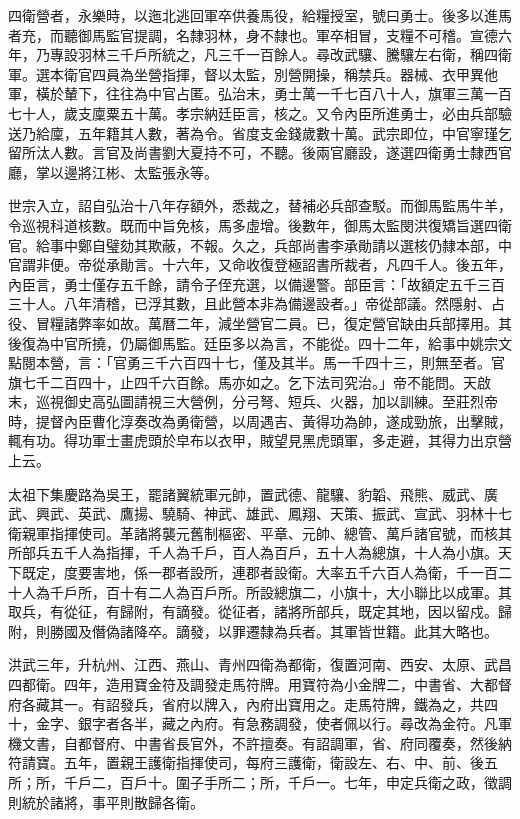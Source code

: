 四衛營者，永樂時，以迤北逃回軍卒供養馬役，給糧授室，號曰勇士。後多以進馬者充，而聽御馬監官提調，名隸羽林，身不隸也。軍卒相冒，支糧不可稽。宣德六年，乃專設羽林三千戶所統之，凡三千一百餘人。尋改武驤、騰驤左右衛，稱四衛軍。選本衛官四員為坐營指揮，督以太監，別營開操，稱禁兵。器械、衣甲異他軍，橫於輦下，往往為中官占匿。弘治末，勇士萬一千七百八十人，旗軍三萬一百七十人，歲支廩粟五十萬。孝宗納廷臣言，核之。又令內臣所進勇士，必由兵部驗送乃給廩，五年籍其人數，著為令。省度支金錢歲數十萬。武宗即位，中官寧瑾乞留所汰人數。言官及尚書劉大夏持不可，不聽。後兩官廳設，遂選四衛勇士隸西官廳，掌以邊將江彬、太監張永等。

世宗入立，詔自弘治十八年存額外，悉裁之，替補必兵部查駁。而御馬監馬牛羊，令巡視科道核數。既而中旨免核，馬多虛增。後數年，御馬太監閔洪復矯旨選四衛官。給事中鄭自璧劾其欺蔽，不報。久之，兵部尚書李承勛請以選核仍隸本部，中官謂非便。帝從承勛言。十六年，又命收復登極詔書所裁者，凡四千人。後五年，內臣言，勇士僅存五千餘，請令子侄充選，以備邊警。部臣言：「故額定五千三百三十人。八年清稽，已浮其數，且此營本非為備邊設者。」帝從部議。然隱射、占役、冒糧諸弊率如故。萬曆二年，減坐營官二員。已，復定營官缺由兵部擇用。其後復為中官所撓，仍屬御馬監。廷臣多以為言，不能從。四十二年，給事中姚宗文點閱本營，言：「官勇三千六百四十七，僅及其半。馬一千四十三，則無至者。官旗七千二百四十，止四千六百餘。馬亦如之。乞下法司究治。」帝不能問。天啟末，巡視御史高弘圖請視三大營例，分弓弩、短兵、火器，加以訓練。至莊烈帝時，提督內臣曹化淳奏改為勇衛營，以周遇吉、黃得功為帥，遂成勁旅，出擊賊，輒有功。得功軍士畫虎頭於皁布以衣甲，賊望見黑虎頭軍，多走避，其得力出京營上云。


太祖下集慶路為吳王，罷諸翼統軍元帥，置武德、龍驤、豹韜、飛熊、威武、廣武、興武、英武、鷹揚、驍騎、神武、雄武、鳳翔、天策、振武、宣武、羽林十七衛親軍指揮使司。革諸將襲元舊制樞密、平章、元帥、總管、萬戶諸官號，而核其所部兵五千人為指揮，千人為千戶，百人為百戶，五十人為總旗，十人為小旗。天下既定，度要害地，係一郡者設所，連郡者設衛。大率五千六百人為衛，千一百二十人為千戶所，百十有二人為百戶所。所設總旗二，小旗十，大小聯比以成軍。其取兵，有從征，有歸附，有謫發。從征者，諸將所部兵，既定其地，因以留戍。歸附，則勝國及僭偽諸降卒。謫發，以罪遷隸為兵者。其軍皆世籍。此其大略也。

洪武三年，升杭州、江西、燕山、青州四衛為都衛，復置河南、西安、太原、武昌四都衛。四年，造用寶金符及調發走馬符牌。用寶符為小金牌二，中書省、大都督府各藏其一。有詔發兵，省府以牌入，內府出寶用之。走馬符牌，鐵為之，共四十，金字、銀字者各半，藏之內府。有急務調發，使者佩以行。尋改為金符。凡軍機文書，自都督府、中書省長官外，不許擅奏。有詔調軍，省、府同覆奏，然後納符請寶。五年，置親王護衛指揮使司，每府三護衛，衛設左、右、中、前、後五所；所，千戶二，百戶十。圍子手所二；所，千戶一。七年，申定兵衛之政，徵調則統於諸將，事平則散歸各衛。

